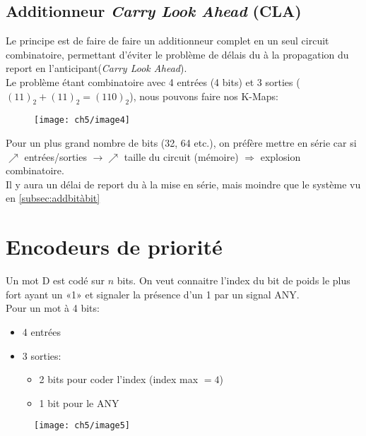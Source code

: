 \subsection{Additionneur \textit{Carry Look Ahead} (CLA)}
Le principe est de faire de faire un additionneur complet en un seul circuit combinatoire, permettant d'éviter le problème de délais du à la propagation du report en l'anticipant(\textit{Carry Look Ahead}).\\
Le problème étant combinatoire avec 4 entrées (4 bits) et 3 sorties ($(11)_2+(11)_2=(110)_2$), nous pouvons faire nos K-Maps:\\
\begin{figure}[H]
	\centering
	\texttt{[image: ch5/image4]}
\end{figure}
Pour un plus grand nombre de bits (32, 64 etc.), on préfère mettre en série car si $\nearrow$ entrées/sorties $\rightarrow \nearrow$ taille du circuit (mémoire) $\Rightarrow$ explosion combinatoire.\\
Il y aura un délai de report du à la mise en série, mais moindre que le système vu en \autoref{subsec:addbitàbit}
\section{Encodeurs de priorité}
Un mot D est codé sur $n$ bits. On veut connaitre l'index du bit de poids le plus fort ayant un «1» et signaler la présence d'un 1 par un signal ANY.\\

Pour un mot à 4 bits:
\begin{itemize}
	\item 4 entrées
	\item 3 sorties:
	\begin{itemize}
		\item 2 bits pour coder l'index (index max $=4$) 
		\item 1 bit pour le ANY
	\end{itemize}
\end{itemize}
\begin{figure}[H]
	\centering
	\texttt{[image: ch5/image5]}
\end{figure}
